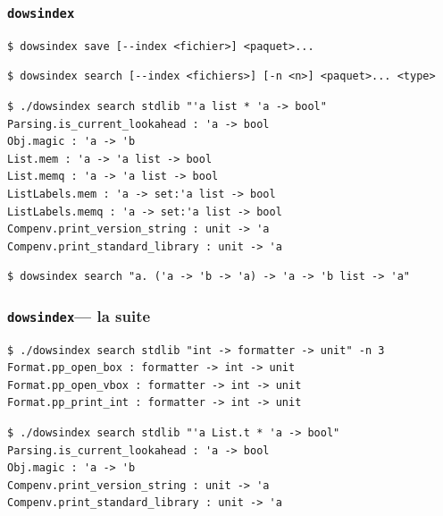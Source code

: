 \documentclass[serif]{beamer}
\newcommand{\dowsindex}{\texttt{dowsindex}\xspace}
\begin{document}

\begin{frame}[fragile=singleslide]\frametitle{\dowsindex}
\footnotesize
\begin{verbatim}
$ dowsindex save [--index <fichier>] <paquet>...
\end{verbatim}
\begin{verbatim}
$ dowsindex search [--index <fichiers>] [-n <n>] <paquet>... <type>
\end{verbatim}
\begin{verbatim}
$ ./dowsindex search stdlib "'a list * 'a -> bool"
Parsing.is_current_lookahead : 'a -> bool
Obj.magic : 'a -> 'b
List.mem : 'a -> 'a list -> bool
List.memq : 'a -> 'a list -> bool
ListLabels.mem : 'a -> set:'a list -> bool
ListLabels.memq : 'a -> set:'a list -> bool
Compenv.print_version_string : unit -> 'a
Compenv.print_standard_library : unit -> 'a
\end{verbatim}
\begin{verbatim}
$ dowsindex search "a. ('a -> 'b -> 'a) -> 'a -> 'b list -> 'a"
\end{verbatim}
\end{frame}


\begin{frame}[fragile=singleslide]\frametitle{\dowsindex — la suite}
\footnotesize
\begin{verbatim}
$ ./dowsindex search stdlib "int -> formatter -> unit" -n 3
Format.pp_open_box : formatter -> int -> unit
Format.pp_open_vbox : formatter -> int -> unit
Format.pp_print_int : formatter -> int -> unit
\end{verbatim}
\begin{verbatim}
$ ./dowsindex search stdlib "'a List.t * 'a -> bool"
Parsing.is_current_lookahead : 'a -> bool
Obj.magic : 'a -> 'b
Compenv.print_version_string : unit -> 'a
Compenv.print_standard_library : unit -> 'a
\end{verbatim}
\end{frame}

\end{document}
